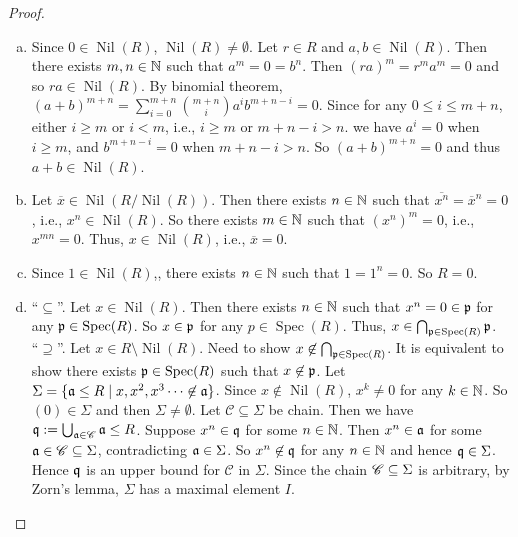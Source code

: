 \begin{proof}
    \begin{enumerate}[(a)]
        \item Since $0 \in \operatorname{Nil}(R)$, $\operatorname{Nil}(R) \neq \emptyset$. Let $r \in R$ and $a,b \in \operatorname{Nil}(R)$. Then there exists $m,n \in \mathbb{N}$ such that $a^m = 0 = b^n$. Then $(ra)^m = r^ma^m = 0$ and so $ra \in \operatorname{Nil}(R)$. By binomial theorem, $(a+b)^{m+n} = \sum_{i=0}^{m+n} \binom {m+n} i a^i b^{m+n-i} = 0$. Since for any $0 \leq i \leq m+n$, either $i \geq m$ or $i < m$, i.e., $i \geq m$ or $m+n-i > n$. we have $a^i = 0$ when $i \geq m$, and $b^{m+n-i} = 0 $ when $m +n-i > n$. So $(a+b)^{m+n} = 0$ and thus $a+b \in \operatorname{Nil}(R)$.
        \item Let $\overbar x \in \operatorname{Nil}(R/\operatorname{Nil}(R))$. Then there exists $n \in \mathbb{N}$ such that $\overbar {x^n} = \overbar x^n = 0$, i.e., $x^n \in \operatorname{Nil}(R)$. So there exists $m \in \mathbb{N}$ such that $(x^n)^m = 0$, i.e., $x^{mn} = 0$. Thus, $x \in \operatorname{Nil}(R)$, i.e., $\overbar x = 0$.
        \item Since $1 \in \operatorname{Nil}(R)$,, there exists $n \in \mathbb{N}$ such that $1 = 1^n = 0$. So $R = 0$.
        \item ``$\subseteq$''. Let $x \in \operatorname{Nil}(R)$. Then there exists $n \in \mathbb{N}$ such that $x^n = 0 \in \mathfrak{p}$ for any $\mathfrak{p} \in \operatorname{Spec}(R)$. So $x \in \mathfrak{p}$ for any $p \in \operatorname{Spec}(R)$. Thus, $x \in \bigcap_{\mathfrak{p} \in \operatorname{Spec}(R)} \mathfrak{p}$. \\
            ``$\supseteq$''. Let $x \in R \setminus \operatorname{Nil}(R)$. Need to show $x \not \in \bigcap_{\mathfrak{p} \in \operatorname{Spec}(R)}$. It is equivalent to show there exists $\mathfrak{p} \in \operatorname{Spec}(R)$ such that $x \not \in \mathfrak{p}$. Let $\Sigma = \{\mathfrak{a} \leq R \mid x,x^2,x^3 \cdots \not \in \mathfrak{a}\}$. Since $x \not \in \operatorname{Nil}(R)$, $x^k \neq 0$ for any $k \in \mathbb{N}$. So $(0) \in \Sigma$ and then $\Sigma \neq \emptyset$. Let $\mathscr C \subseteq \Sigma$ be chain. Then we have $\mathfrak{q} := \bigcup_{\mathfrak{a} \in \mathscr C} \mathfrak{a} \leq R$. Suppose $x^n \in \mathfrak{q}$ for some $n \in \mathbb{N}$. Then $x^n \in \mathfrak{a}$ for some $\mathfrak{a} \in \mathscr C \subseteq \Sigma$, contradicting $\mathfrak{a} \in \Sigma$. So $x^n \not \in \mathfrak{q}$ for any $n \in \mathbb{N}$ and hence $\mathfrak{q} \in \Sigma$. Hence $\mathfrak{q}$ is an upper bound for $\mathscr C$ in $\Sigma$. Since the chain $\mathscr{C} \subseteq \Sigma$ is arbitrary, by Zorn's lemma, $\Sigma$ has a maximal element $I$. \\

\end{enumerate}
\end{proof}

